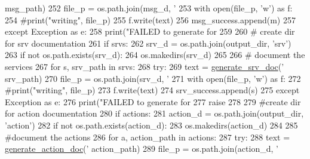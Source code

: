 \begin{DoxyCode}
{      msg\_path)
252             file\_p = os.path.join(msg\_d, \textcolor{stringliteral}{'%
253             with open(file\_p, \textcolor{stringliteral}{'w'}) \textcolor{keyword}{as} f:
254                 \textcolor{comment}{#print("writing", file\_p)}
255                 f.write(text)
256             msg\_success.append(m)
257         \textcolor{keywordflow}{except} Exception \textcolor{keyword}{as} e:
258             print(\textcolor{stringliteral}{"FAILED to generate for %
259 
260     \textcolor{comment}{# create dir for srv documentation}
261     \textcolor{keywordflow}{if} srvs:
262         srv\_d = os.path.join(output\_dir, \textcolor{stringliteral}{'srv'})
263         \textcolor{keywordflow}{if} \textcolor{keywordflow}{not} os.path.exists(srv\_d):
264             os.makedirs(srv\_d)
265 
266     \textcolor{comment}{# document the services}
267     \textcolor{keywordflow}{for} s, srv\_path \textcolor{keywordflow}{in} srvs:
268         \textcolor{keywordflow}{try}:
269             text = \hyperlink{namespacerosdoc__lite_1_1msgenator_a06365fda5c3fb07b4e07c46bb24a5077}{generate\_srv\_doc}(\textcolor{stringliteral}{'%
      srv\_path)
270             file\_p = os.path.join(srv\_d, \textcolor{stringliteral}{'%
271             with open(file\_p, \textcolor{stringliteral}{'w'}) \textcolor{keyword}{as} f:
272                 \textcolor{comment}{#print("writing", file\_p)}
273                 f.write(text)
274             srv\_success.append(s)
275         \textcolor{keywordflow}{except} Exception \textcolor{keyword}{as} e:
276             print(\textcolor{stringliteral}{"FAILED to generate for %
277             \textcolor{keywordflow}{raise}
278 
279     \textcolor{comment}{#create dir for action documentation}
280     \textcolor{keywordflow}{if} actions:
281         action\_d = os.path.join(output\_dir, \textcolor{stringliteral}{'action'})
282         \textcolor{keywordflow}{if} \textcolor{keywordflow}{not} os.path.exists(action\_d):
283             os.makedirs(action\_d)
284 
285     \textcolor{comment}{#document the actions}
286     \textcolor{keywordflow}{for} a, action\_path \textcolor{keywordflow}{in} actions:
287         \textcolor{keywordflow}{try}:
288             text = \hyperlink{namespacerosdoc__lite_1_1msgenator_af6701c159861799487da66dc92db3540}{generate\_action\_doc}(\textcolor{stringliteral}{'%
      action\_path)
289             file\_p = os.path.join(action\_d, \textcolor{stringliteral}{'%
}}}}}}}}
\end{DoxyCode}
